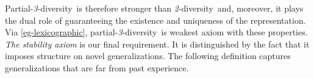 \documentclass[ecta,nameyear,draft]{econsocart}
\newcommand{\parthreediv}{\textup{partial-\textit{3}-diversity}}
\newcommand{\Parthreediv}{\textup{Partial-\textit{3}-diversity}}
\newcommand{\twodiv}{\textit{2}-\textup{diversity}}
\theoremstyle{plain}
\theoremstyle{remark}
\begin{document}
\Parthreediv\ is therefore stronger than \twodiv\ and, moreover, it plays the
dual role of guaranteeing the existence and uniqueness of the representation.
Via \cref{eg-lexicographic}, \parthreediv\ is weakest axiom with these
properties.
\emph{The {stability} axiom } is our final requirement. It is distinguished by
the fact that it imposes structure on novel {generalization}s. The following
definition captures generalizations that are far from past experience.
\end{document}
